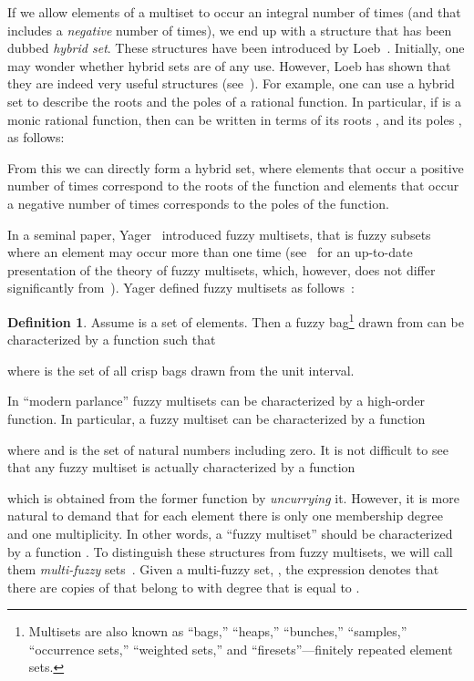 \documentclass{amsart}
\theoremstyle{definition}
\newtheorem{definition}[theorem]{Definition}
\begin{document}
If we allow elements of a multiset to occur an integral number of times (and 
that includes a {\em negative} number of times), we end up with a structure that
has been dubbed {\em hybrid set}. These structures have been introduced by 
Loeb~\cite{loeb92}. Initially, one may wonder whether hybrid sets are of any 
use. However, Loeb has shown that they are indeed very useful structures 
(see~\cite{loeb92,loeb95}). For example, one can use a hybrid set to describe 
the roots and the poles of a rational function. In particular, if  is a 
monic rational function, then  can be written  in terms of its roots 
, and its poles , as follows:

From this we can directly form a hybrid set, where elements that occur a 
positive number of times correspond to the roots of the function and
elements that occur a negative number of times corresponds to the poles of 
the function.

In a seminal paper, Yager~\cite{yager86} introduced fuzzy multisets, that is
fuzzy subsets where an element may occur more than one time 
(see~\cite{miyamoto04} for an up-to-date presentation of the theory of fuzzy 
multisets, which, however, does not differ significantly 
from~\cite{miyamoto01}). Yager defined fuzzy multisets as follows~\cite{yager86}:
\begin{definition}
Assume  is a set of elements. Then a fuzzy bag\footnote{Multisets are also known
as ``bags,'' ``heaps,'' ``bunches,'' ``samples,'' ``occurrence sets,''
``weighted sets,'' and ``firesets''---finitely repeated element sets.}  
drawn from  can be characterized by a function 
 such that
 
where  is the set of all crisp bags drawn from the unit interval.
\end{definition}
In ``modern parlance'' fuzzy multisets can be characterized by a high-order 
function. In particular, a fuzzy multiset  can be characterized by a 
function
  
where  and  is the set of natural numbers
including zero. It is not difficult to see that any fuzzy multiset  is 
actually characterized by a function 

which is obtained from the former function by {\em uncurrying} it. However,
it is more natural to demand that for each element  there is only one 
membership degree and one multiplicity. In other words, a ``fuzzy multiset''  
should be characterized by a function . 
To distinguish these structures from fuzzy multisets, we will call them {\em multi-fuzzy}
sets~\cite{syropoulos06}. Given a multi-fuzzy set, , the expression  denotes 
that there are  copies of  that belong to  with degree that is equal to . 
\end{document}
